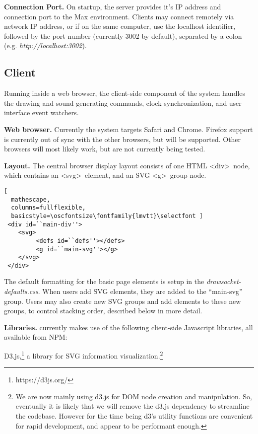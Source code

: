 \medskip
\noindent
\textbf{Connection Port.} 
On startup, the server provides it's IP address and connection port to the Max environment.
Clients may connect remotely via network IP address, or if on the same computer, use the localhost identifier, followed by the port number (currently 3002 by default), separated by a colon (e.g. \textit{http://localhost:3002}).
 
 \subsection{Client}  
Running inside a web browser, the client-side component of the \drawsocket system handles the drawing and sound generating commands, clock synchronization, and user interface event watchers.

\medskip
\noindent
\textbf{Web browser.}  
Currently the system targets Safari and Chrome. 
Firefox support is currently out of sync with the other browsers, but will be supported. Other browsers will most likely work, but are not currently being tested.

\medskip
\noindent
\textbf{Layout.}
The central browser display layout consists of one HTML \textless div\textgreater\ node, which contains an \textless svg\textgreater\ element, and an SVG \textless g\textgreater\ group node. 

\begin{lstlisting}[
  mathescape,
  columns=fullflexible,
  basicstyle=\oscfontsize\fontfamily{lmvtt}\selectfont ]
 <div id=``main-div''>
    <svg>
         <defs id=``defs''></defs>
         <g id=``main-svg''></g>
    </svg>
 </div>
\end{lstlisting}

The default formatting for the basic page elements is setup in the \textit{drawsocket-defaults.css}.
When users add SVG elements, they are added to the ``main-svg'' group.
Users may also create new SVG groups and add elements to these new groups, to control stacking order, described below in more detail.

\medskip
\noindent
\textbf{Libraries.}
\drawsocket currently makes use of the following client-side Javascript libraries, all available from NPM:

{D3.js},\footnote{https://d3js.org/} a library for SVG information visualization.\footnote{We are now mainly using d3.js for DOM node creation and manipulation. So, eventually it is likely that we will remove the d3.js dependency to streamline the codebase. However for the time being d3's utility functions are convenient for rapid development, and appear to be performant enough.}

